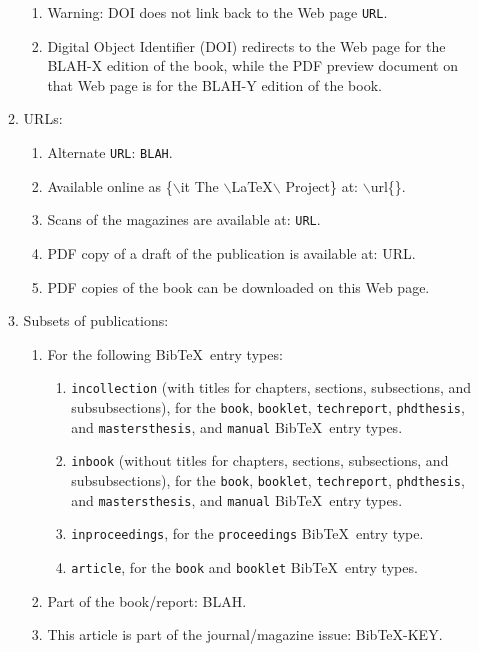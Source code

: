\documentclass[letter,12pt]{article}
\begin{document}
\begin{enumerate}
\begin{enumerate}
\begin{enumerate}
		\item Warning: DOI does not link back to the Web page {\tt URL}.
		\item Digital Object Identifier (DOI) redirects to the Web page for the BLAH-X edition of the book, while the PDF preview document on that Web page is for the BLAH-Y edition of the book.
		\end{enumerate}
	\item URLs: \vspace{-0.2cm}
		\begin{enumerate} \itemsep -2pt
		\item Alternate {\tt URL}: {\tt BLAH}.
		\item Available online as \{$\backslash$it The $\backslash$LaTeX$\backslash$ Project\} at: $\backslash$url\{\}.
		\item Scans of the magazines are available at: {\tt URL}.
		\item PDF copy of a draft of the publication is available at: URL.
		\item PDF copies of the book can be downloaded on this Web page.
		\end{enumerate}
	\item Subsets of publications: \vspace{-0.2cm}
		\begin{enumerate} \itemsep -2pt
		\item For the following {\sc Bib}\TeX\ entry types: \vspace{-0.1cm}
			\begin{enumerate} \itemsep -1pt
			\item {\tt incollection} (with titles for chapters, sections, subsections, and subsubsections), for the {\tt book}, {\tt booklet}, {\tt techreport}, {\tt phdthesis}, and {\tt mastersthesis}, and {\tt manual} {\sc Bib}\TeX\ entry types.
			\item {\tt inbook} (without titles for chapters, sections, subsections, and subsubsections), for the {\tt book}, {\tt booklet}, {\tt techreport}, {\tt phdthesis}, and {\tt mastersthesis}, and {\tt manual} {\sc Bib}\TeX\ entry types.
			\item {\tt inproceedings}, for the {\tt proceedings} {\sc Bib}\TeX\ entry type.
			\item {\tt article}, for the {\tt book} and {\tt booklet} {\sc Bib}\TeX\ entry types.
			\end{enumerate}
		\item Part of the book/report: BLAH.
		\item This article is part of the journal/magazine issue: BibTeX-KEY.

\end{enumerate}
\end{enumerate}
\end{enumerate}
\end{document}
